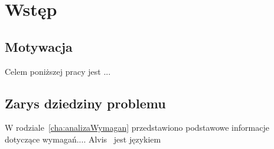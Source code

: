 \chapter{Wstęp}
\label{cha:wstep}


\section{Motywacja}
\label{sec:motywacja}

Celem poniższej pracy jest ...



\section{Zarys dziedziny problemu}
\label{sec:zarysDziedzinyProblemu}

W rodziale~\ref{cha:analizaWymagan} przedstawiono podstawowe informacje dotyczące wymagań.... Alvis~\cite{Alvis2011} jest językiem 


















